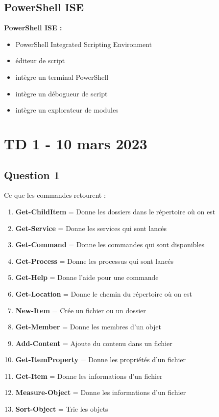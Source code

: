 \documentclass[12pt, a4paper]{article}
\begin{document}
\subsection{PowerShell ISE}
\textbf{PowerShell ISE :}\\

    \begin{itemize}
        \item PowerShell Integrated Scripting Environment
        \item éditeur de script
        \item intègre un terminal PowerShell
        \item intègre un débogueur de script
        \item intègre un explorateur de modules\\
    \end{itemize}

\section{TD 1 - 10 mars 2023}
\subsection{Question 1}
Ce que les commandes retourent :\\
\begin{enumerate}
    \item \textbf{Get-ChildItem} = Donne les dossiers dans le répertoire où on est 
    \item \textbf{Get-Service} = Donne les services qui sont lancés
    \item \textbf{Get-Command} = Donne les commandes qui sont disponibles
    \item \textbf{Get-Process} = Donne les processus qui sont lancés
    \item \textbf{Get-Help} = Donne l'aide pour une commande
    \item \textbf{Get-Location} = Donne le chemin du répertoire où on est
    \item \textbf{New-Item} = Crée un fichier ou un dossier
    \item \textbf{Get-Member} = Donne les membres d'un objet
    \item \textbf{Add-Content} = Ajoute du contenu dans un fichier
    \item \textbf{Get-ItemProperty} = Donne les propriétés d'un fichier
    \item \textbf{Get-Item} = Donne les informations d'un fichier
    \item \textbf{Measure-Object} = Donne les informations d'un fichier
    \item \textbf{Sort-Object} = Trie les objets
\end{enumerate}
\end{document}
